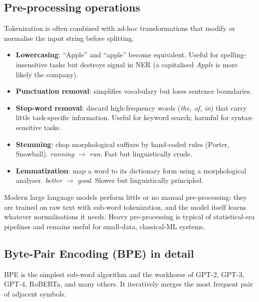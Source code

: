 \subsection{Pre-processing operations}

Tokenization is often combined with ad-hoc transformations that modify or normalise the input string before splitting.

\begin{itemize}
    \item \textbf{Lowercasing}: ``Apple'' and ``apple'' become equivalent. Useful for spelling-insensitive tasks but destroys signal in NER (a capitalised \emph{Apple} is more likely the company).
    \item \textbf{Punctuation removal}: simplifies vocabulary but loses sentence boundaries.
    \item \textbf{Stop-word removal}: discard high-frequency words (\emph{the, of, in}) that carry little task-specific information. Useful for keyword search; harmful for syntax-sensitive tasks.
    \item \textbf{Stemming}: chop morphological suffixes by hand-coded rules (Porter, Snowball). \emph{running} $\to$ \emph{run}. Fast but linguistically crude.
    \item \textbf{Lemmatization}: map a word to its dictionary form using a morphological analyser. \emph{better} $\to$ \emph{good}. Slower but linguistically principled.
\end{itemize}

\begin{remark}
Modern large language models perform little or no manual pre-processing: they are trained on raw text with sub-word tokenization, and the model itself learns whatever normalisations it needs. Heavy pre-processing is typical of statistical-era pipelines and remains useful for small-data, classical-ML systems.
\end{remark}

\subsection{Byte-Pair Encoding (BPE) in detail}

BPE is the simplest sub-word algorithm and the workhorse of GPT-2, GPT-3, GPT-4, RoBERTa, and many others. It iteratively merges the most frequent pair of adjacent symbols.

